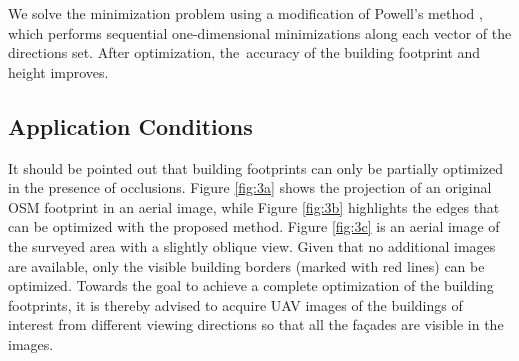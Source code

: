 We solve the minimization problem using a modification of Powell’s method \cite{powell1964efficient, press1989numerical}, which performs sequential one-dimensional minimizations along each vector of the directions set. After optimization, the~accuracy of the building footprint and height improves. 





\subsection{Application Conditions}
It should be pointed out that building footprints can only be partially optimized in the presence of occlusions. Figure \ref{fig:3a} shows the projection of an original OSM footprint in an aerial image, while Figure \ref{fig:3b} highlights the edges that can be optimized with the proposed method. Figure \ref{fig:3c} is an aerial image of the surveyed area with a slightly oblique view. Given that no additional images are available, only the visible building borders (marked with red lines) can be optimized. Towards the goal to achieve a complete optimization of the building footprints, it is thereby advised to acquire UAV images of the buildings of interest from different viewing directions so that all the fa\c{c}ades are visible in the images.

 

